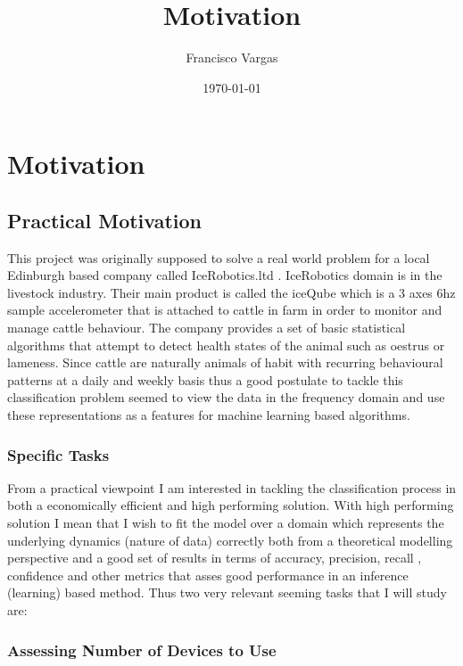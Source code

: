 \documentclass[10pt]{article}
\title{Motivation}
\author{Francisco Vargas}
\date{\today}
\begin{document}
\maketitle

\section{Motivation}

\subsection{Practical Motivation}

This project was originally supposed to solve a real world problem for a local Edinburgh based company called IceRobotics.ltd .
  \newline\newline
  IceRobotics domain is in the livestock industry. Their main product is called the iceQube which is a 3 axes 6hz sample accelerometer that is attached to cattle in farm in order to monitor and manage cattle behaviour. 
  \newline\newline
  The company provides a set of basic statistical algorithms that attempt to detect health states of the animal such as oestrus or lameness. Since cattle are naturally animals of habit with recurring behavioural patterns at a daily and weekly basis thus a good postulate to tackle this classification problem seemed to view the data in the frequency domain and use these representations as a features for machine learning based algorithms.
  
 \subsubsection{Specific Tasks}
 From a practical viewpoint I am interested in tackling the classification process in both a economically efficient and high performing solution. With high performing solution I mean that I wish to fit the model over a domain which represents the underlying dynamics (nature of data) correctly both from a theoretical modelling perspective and a good set of results in terms of accuracy, precision, recall , confidence and other metrics that asses good performance in an inference (learning) based method. Thus two very relevant seeming tasks that I will study are:
 
 \subsubsection{Assessing Number of Devices to Use}
 
\end{document}
